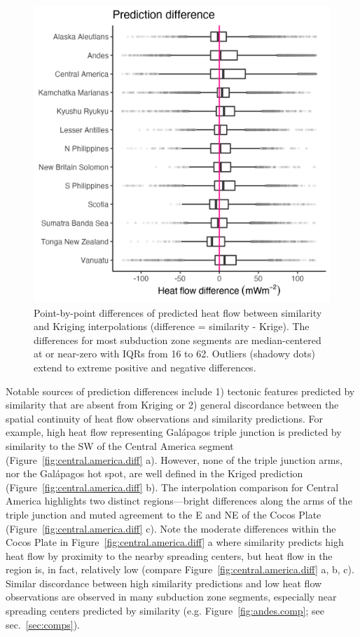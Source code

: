 \documentclass[draft,linenumbers]{agujournal2018}
\begin{document}
\begin{figure}[h]

{\centering \includegraphics[width=0.6\linewidth,]{../figs/summary/hf_diff_summary} 

}

\caption{Point-by-point differences of predicted heat flow between similarity and Kriging interpolations (difference = similarity - Krige). The differences for most subduction zone segments are median-centered at or near-zero with IQRs from 16 to 62. Outliers (shadowy dots) extend to extreme positive and negative differences.}\label{fig:diff.summary.plot}
\end{figure}

Notable sources of prediction differences include 1) tectonic features
predicted by similarity that are absent from Kriging or 2) general
discordance between the spatial continuity of heat flow observations and
similarity predictions. For example, high heat flow representing
Galápagos triple junction is predicted by similarity to the SW of the
Central America segment (Figure~\ref{fig:central.america.diff} a).
However, none of the triple junction arms, nor the Galápagos hot spot,
are well defined in the Kriged prediction
(Figure~\ref{fig:central.america.diff} b). The interpolation comparison
for Central America highlights two distinct regions---bright differences
along the arms of the triple junction and muted agreement to the E and
NE of the Cocos Plate (Figure~\ref{fig:central.america.diff} c). Note
the moderate differences within the Cocos Plate in
Figure~\ref{fig:central.america.diff} a where similarity predicts high
heat flow by proximity to the nearby spreading centers, but heat flow in
the region is, in fact, relatively low (compare
Figure~\ref{fig:central.america.diff} a, b, c). Similar discordance
between high similarity predictions and low heat flow observations are
observed in many subduction zone segments, especially near spreading
centers predicted by similarity (e.g. Figure~\ref{fig:andes.comp}; see
sec.~\ref{sec:comps}).
\end{document}
